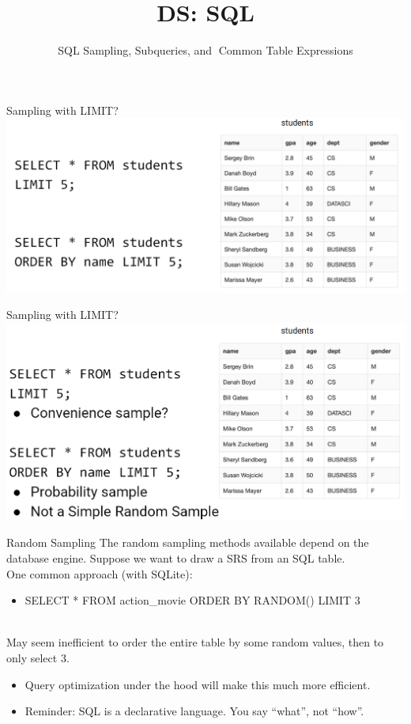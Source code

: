 \documentclass[aspectratio=169]{../latex_main/tntbeamer}  %
\title[Introduction]{DS: SQL}
\subtitle{SQL Sampling, Subqueries, and Common Table Expressions}
\begin{document}
	
	\maketitle
	\begin{frame}{Sampling with LIMIT?}
	    \includegraphics[scale=.35]{Bild30}
	\end{frame}
	
	
	\begin{frame}{Sampling with LIMIT?}
	    \includegraphics[scale=.35]{Bild31}
	\end{frame}
	
	
	\begin{frame}{Random Sampling}
	    The random sampling methods available depend on the database engine. Suppose we want to draw a SRS from an SQL table.\\
	    \bigskip
	    One common approach (with SQLite):
	    \begin{itemize}
	        \item SELECT * FROM action\_movie ORDER BY RANDOM() LIMIT 3
	    \end{itemize}
	    \\\bigskip
	    May seem inefficient to order the entire table by some random values, then to only select 3.
	    \begin{itemize}
	        \item Query optimization under the hood will make this much more efficient.
	        \item Reminder: SQL is a declarative language. You say “what”, not “how”.
	    \end{itemize}
	\end{frame}
	
\end{document}

